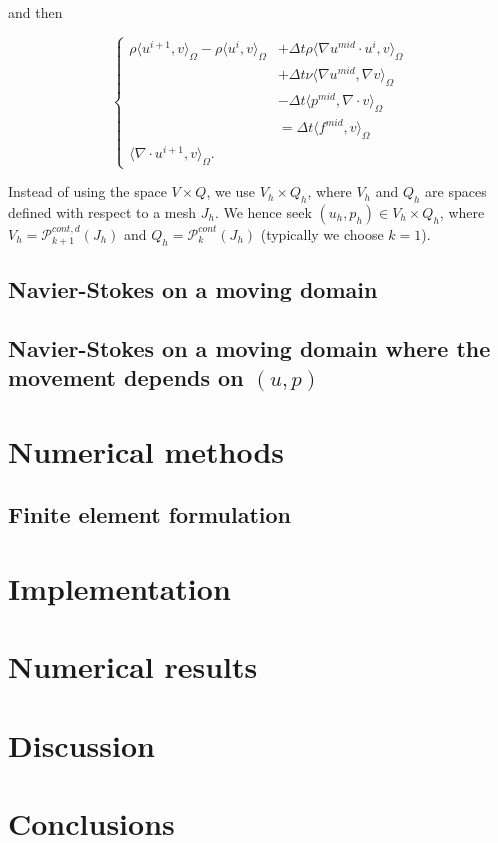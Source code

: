 \documentclass[11pt,a4paper,titlepage]{report}
\begin{document}
and then

\[
\left\{  
\begin{aligned}
\rho \langle u^{i+1},v \rangle_\Omega - \rho \langle u^i, v \rangle_\Omega & + \Delta t \rho \langle \nabla u^{mid} \cdot u^i  ,v \rangle_\Omega \\
& + \Delta t \nu \langle \nabla u^{mid}, \nabla v \rangle_\Omega \\
& - \Delta t \langle p^{mid} , \nabla \cdot v \rangle_\Omega \\
& = \Delta t \langle f^{mid} ,v \rangle_\Omega \\
\langle \nabla \cdot u^{i+1},v \rangle_\Omega.
\end{aligned}
\right.
\]

Instead of using the space $V \times Q$, we use $V_h \times Q_h$, where $V_h$ and $Q_h$ are spaces defined with respect to a mesh $J_h$. We hence seek $(u_h, p_h) \in V_h \times Q_h$, where $V_h = \mathcal{P}^{cont,d}_{k+1} (J_h)$ and $Q_h = \mathcal{P}^{cont}_{k} (J_h)$ (typically we choose $k=1$). \\

\section{Navier-Stokes on a moving domain}

\section{Navier-Stokes on a moving domain where the movement depends on $(u,p)$}

\chapter{Numerical methods}

\section{Finite element formulation}

\chapter{Implementation}

\chapter{Numerical results}

\chapter{Discussion}

\chapter{Conclusions}
\end{document}
